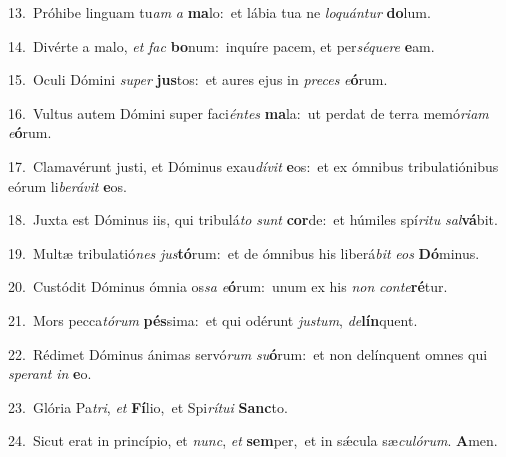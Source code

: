 {\numbfont\textcolor{\numbcolor}{13.}}~Próhibe linguam tu\textit{am} \textit{a} \textbf{ma}\-lo:~\star et lábia tua ne \textit{lo}\-\textit{quán}\textit{tur} \textbf{do}\-lum.\par
{\numbfont\textcolor{\numbcolor}{14.}}~Divérte a malo, \textit{et} \textit{fac} \textbf{bo}\-num:~\star inquíre pacem, et per\-\textit{sé}\-\textit{que}\textit{re} \textbf{e}\-am.\par
{\numbfont\textcolor{\numbcolor}{15.}}~Oculi Dómini \textit{su}\-\textit{per} \textbf{jus}\-tos:~\star et aures ejus in \textit{pre}\-\textit{ces} \textit{e}\-\textbf{ó}rum.\par
{\numbfont\textcolor{\numbcolor}{16.}}~Vultus autem Dómini super faci\-\textit{én}\-\textit{tes} \textbf{ma}\-la:~\star ut perdat de terra memó\-\textit{ri}\-\textit{am} \textit{e}\-\textbf{ó}rum.\par
{\numbfont\textcolor{\numbcolor}{17.}}~Clamavérunt justi, et Dóminus exau\-\textit{dí}\-\textit{vit} \textbf{e}\-os:~\star et ex ómnibus tribulatiónibus eórum li\-\textit{be}\-\textit{rá}\textit{vit} \textbf{e}\-os.\par
{\numbfont\textcolor{\numbcolor}{18.}}~Juxta est Dóminus iis, qui tribulá\textit{to} \textit{sunt} \textbf{cor}\-de:~\star et húmiles spí\-\textit{ri}\-\textit{tu} \textit{sal}\-\textbf{vá}bit.\par
{\numbfont\textcolor{\numbcolor}{19.}}~Multæ tribulatió\textit{nes} \textit{jus}\-\textbf{tó}rum:~\star et de ómnibus his liberá\textit{bit} \textit{e}\-\textit{os} \textbf{Dó}\-minus.\par
{\numbfont\textcolor{\numbcolor}{20.}}~Custódit Dóminus ómnia os\textit{sa} \textit{e}\-\textbf{ó}rum:~\star unum ex his \textit{non} \textit{con}\-\textit{te}\textbf{ré}tur.\par
{\numbfont\textcolor{\numbcolor}{21.}}~Mors pecca\-\textit{tó}\-\textit{rum} \textbf{pés}\-sima:~\star et qui odérunt \textit{jus}\-\textit{tum}, \textit{de}\-\textbf{lín}quent.\par
{\numbfont\textcolor{\numbcolor}{22.}}~Rédimet Dóminus ánimas servó\textit{rum} \textit{su}\-\textbf{ó}rum:~\star et non delínquent omnes qui \textit{spe}\-\textit{rant} \textit{in} \textbf{e}\-o.\par
{\numbfont\textcolor{\numbcolor}{23.}}~Glória Pa\-\textit{tri}\-, \textit{et} \textbf{Fí}\-lio,~\star et Spi\-\textit{rí}\-\textit{tu}\textit{i} \textbf{Sanc}\-to.\par
{\numbfont\textcolor{\numbcolor}{24.}}~Sicut erat in princípio, et \textit{nunc}\-, \textit{et} \textbf{sem}\-per,~\star et in sǽcula sæ\-\textit{cu}\-\textit{ló}\textit{rum}. \textbf{A}\-men.\par
